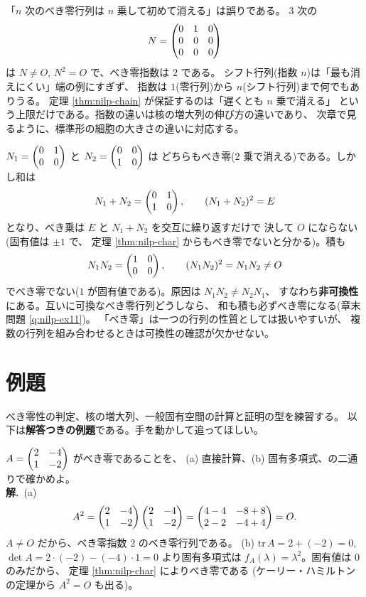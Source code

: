\begin{hanrei}\label{hanrei:nilp-index}
「$n$ 次のべき零行列は $n$ 乗して初めて消える」は誤りである。
$3$ 次の
\[
N = \begin{pmatrix}0 & 1 & 0 \\ 0 & 0 & 0 \\ 0 & 0 & 0\end{pmatrix}
\]
は $N \neq O$, $N^2 = O$ で、べき零指数は $2$ である。
シフト行列(指数 $n$)は「最も消えにくい」端の例にすぎず、
指数は $1$(零行列)から $n$(シフト行列)まで何でもありうる。
定理 \ref{thm:nilp-chain} が保証するのは「遅くとも $n$ 乗で消える」
という上限だけである。指数の違いは核の増大列の伸び方の違いであり、
次章で見るように、標準形の細胞の大きさの違いに対応する。
\end{hanrei}

\begin{hanrei}\label{hanrei:nilp-sum}
$N_1 = \begin{pmatrix}0 & 1 \\ 0 & 0\end{pmatrix}$ と $N_2 = \begin{pmatrix}0 & 0 \\ 1 & 0\end{pmatrix}$ は
どちらもべき零($2$ 乗で消える)である。しかし和は
\[
N_1 + N_2 = \begin{pmatrix}0 & 1 \\ 1 & 0\end{pmatrix}, \qquad
(N_1 + N_2)^2 = E
\]
となり、べき乗は $E$ と $N_1 + N_2$ を交互に繰り返すだけで
決して $O$ にならない(固有値は $\pm 1$ で、
定理 \ref{thm:nilp-char} からもべき零でないと分かる)。積も
\[
N_1 N_2 = \begin{pmatrix}1 & 0 \\ 0 & 0\end{pmatrix}, \qquad (N_1 N_2)^2 = N_1 N_2 \neq O
\]
でべき零でない($1$ が固有値である)。原因は $N_1 N_2 \neq N_2 N_1$、
すなわち\textbf{非可換性}にある。互いに可換なべき零行列どうしなら、
和も積も必ずべき零になる(章末問題 \ref{q:nilp-ex11})。
「べき零」は一つの行列の性質としては扱いやすいが、
複数の行列を組み合わせるときは可換性の確認が欠かせない。
\end{hanrei}

\section{例題}

べき零性の判定、核の増大列、一般固有空間の計算と証明の型を練習する。
以下は\textbf{解答つきの例題}である。手を動かして追ってほしい。

\begin{rei}[例題・基本(べき零性の判定)]\label{rei:nilp-2x2}
$A = \begin{pmatrix}2 & -4 \\ 1 & -2\end{pmatrix}$ がべき零であることを、
(a) 直接計算、(b) 固有多項式、の二通りで確かめよ。\\
\textbf{解.}\ (a)
\[
A^2 = \begin{pmatrix}2 & -4 \\ 1 & -2\end{pmatrix}\begin{pmatrix}2 & -4 \\ 1 & -2\end{pmatrix}
= \begin{pmatrix}4 - 4 & -8 + 8 \\ 2 - 2 & -4 + 4\end{pmatrix} = O.
\]
$A \neq O$ だから、べき零指数 $2$ のべき零行列である。
(b) $\mathrm{tr}\,A = 2 + (-2) = 0$,
$\det A = 2 \cdot (-2) - (-4) \cdot 1 = 0$ より固有多項式は
$f_A(\lambda) = \lambda^2$。固有値は $0$ のみだから、
定理 \ref{thm:nilp-char} によりべき零である
(ケーリー・ハミルトンの定理から $A^2 = O$ も出る)。
\end{rei}

